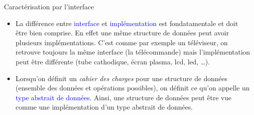 \documentclass[10pt]{beamer}
\begin{document}
\begin{frame}{\Ctitle}{\stitle}
	\begin{alertblock}{Caractérisation par l'interface}
		\begin{itemize}
			\item<1-> La différence entre \textcolor{blue}{interface} et \textcolor{blue}{implémentation} est fondatamentale et doit être bien comprise. En effet une même structure de données peut avoir plusieurs implémentations. C'est comme par exemple un téléviseur, on retrouve toujours la même interface (la télécommande) mais l'implémentation peut être différente (tube cathodique, écran plasma, lcd, led, \dots).
			\item<2-> Lorsqu'on définit un \textit{cahier des charges} pour une structure de données (ensemble des données et opérations possibles), on définit ce qu'on appelle un \textcolor{blue}{type abstrait de données}.  Ainsi, une structure de données peut être vue comme une implémentation d'un type abstrait de données.
		\end{itemize}
	\end{alertblock}
\end{frame}
\end{document}
